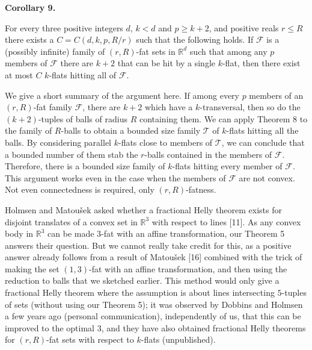 \par
\par\medskip\noindent\textbf{Corollary 9.}\par
For every three positive integers $d$, $k<d$ and $p\geq k+2$, and positive reals $r\leq R$ there exists a $C=C(d,k,p,R/r)$ such that the following holds. If $\mathcal{F}$ is a (possibly infinite) family of $(r,R)$-fat sets in $\mathbb{R}^{d}$ such that among any $p$ members of $\mathcal{F}$ there are $k+2$ that can be hit by a single $k$-flat, then there exist at most $C$ $k$-flats hitting all of $\mathcal{F}$.
\par
\par
\par
We give a short summary of the argument here. If among every $p$ members of an $(r,R)$-fat family $\mathcal{F}$, there are $k+2$ which have a $k$-transversal, then so do the $(k+2)$-tuples of balls of radius $R$ containing them. We can apply Theorem 8 to the family of $R$-balls to obtain a bounded size family $\mathcal{T}$ of $k$-flats hitting all the balls. By considering parallel $k$-flats close to members of $\mathcal{T}$, we can conclude that a bounded number of them stab the $r$-balls contained in the members of $\mathcal{F}$. Therefore, there is a bounded size family of $k$-flats hitting every member of $\mathcal{F}$. This argument works even in the case when the members of $\mathcal{F}$ are not convex. Not even connectedness is required, only $(r,R)$-fatness.
\par
\par
Holmsen and Matoušek asked whether a fractional Helly theorem exists for disjoint translates of a convex set in $\mathbb{R}^{3}$ with respect to lines [11]. As any convex body in $\mathbb{R}^{3}$ can be made $3$-fat with an affine transformation, our Theorem 5 answers their question. But we cannot really take credit for this, as a positive answer already follows from a result of Matoušek [16] combined with the trick of making the set $(1,3)$-fat with an affine transformation, and then using the reduction to balls that we sketched earlier. This method would only give a fractional Helly theorem where the assumption is about lines intersecting $5$-tuples of sets (without using our Theorem 5); it was observed by Dobbins and Holmsen a few years ago (personal communication), independently of us, that this can be improved to the optimal $3$, and they have also obtained fractional Helly theorems for $(r,R)$-fat sets with respect to $k$-flats (unpublished).
